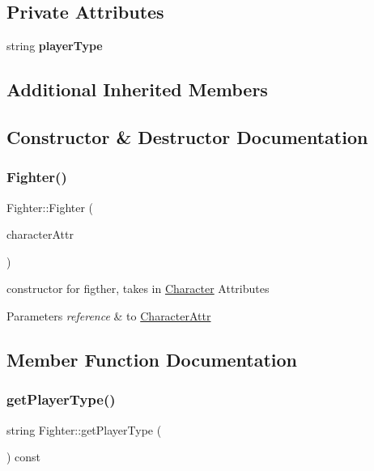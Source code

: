 \subsection*{Private Attributes}
\begin{DoxyCompactItemize}
\item 
\hypertarget{class_fighter_af2825561c06b7c5cfc5159eb4b39466b}{}\label{class_fighter_af2825561c06b7c5cfc5159eb4b39466b} 
string {\bfseries player\+Type}
\end{DoxyCompactItemize}
\subsection*{Additional Inherited Members}


\subsection{Constructor \& Destructor Documentation}
\hypertarget{class_fighter_a0cae9242bed3683042205be70c67b02f}{}\label{class_fighter_a0cae9242bed3683042205be70c67b02f} 
\subsubsection{\texorpdfstring{Fighter()}{Fighter()}}
{\footnotesize\ttfamily Fighter\+::\+Fighter (\begin{DoxyParamCaption}\item[{\hyperlink{class_character_attr}{Character\+Attr} $\ast$}]{character\+Attr }\end{DoxyParamCaption})}

constructor for figther, takes in \hyperlink{class_character}{Character} Attributes 
\begin{DoxyParams}{Parameters}
{\em reference} & to \hyperlink{class_character_attr}{Character\+Attr} \\
\hline
\end{DoxyParams}


\subsection{Member Function Documentation}
\hypertarget{class_fighter_a928346e8e831a642622e89233100dc0e}{}\label{class_fighter_a928346e8e831a642622e89233100dc0e} 
\subsubsection{\texorpdfstring{get\+Player\+Type()}{getPlayerType()}}
{\footnotesize\ttfamily string Fighter\+::get\+Player\+Type (\begin{DoxyParamCaption}{ }\end{DoxyParamCaption}) const}

